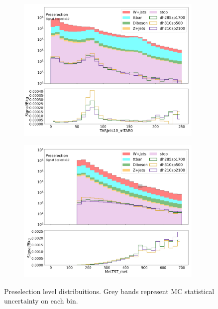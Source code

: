 \begin{figure}[htbp]
\begin{subfigure}{0.49\textwidth}
     \includegraphics[width = 0.98\textwidth]{Figures/appendix/Preselection/TARJets10_mTAR0.png}
     \caption{\mTAR}
     \end{subfigure}
     \begin{subfigure}{0.49\textwidth}
     \includegraphics[width = 0.98\textwidth]{Figures/appendix/Preselection/MetTST_met.png}
     \caption{\met}
     \end{subfigure}
     \caption{Preselection level distribuitions. Grey bands represent MC statistical uncertainty on each bin.}
     \label{fig:Presel1}
  \end{figure}

